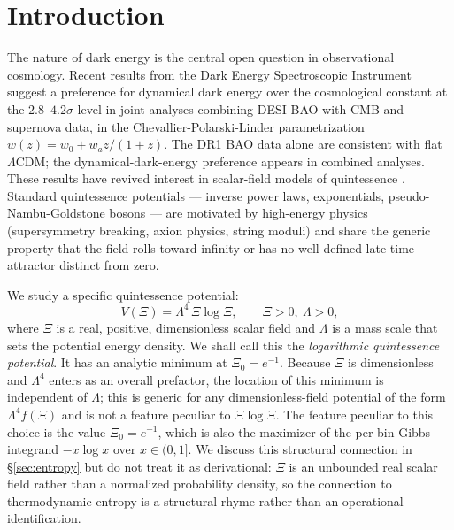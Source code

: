 \documentclass[11pt,reqno]{amsart}
\theoremstyle{plain}
\theoremstyle{definition}
\theoremstyle{remark}
\begin{document}
\maketitle

\section{Introduction}

The nature of dark energy is the central open question in observational
cosmology. Recent results from the Dark Energy Spectroscopic Instrument
\cite{DESI2024BAO,DESI2024VI} suggest a preference for dynamical dark energy
over the cosmological constant at the $2.8$--$4.2\sigma$ level in joint
analyses combining DESI BAO with CMB and supernova data, in the
Chevallier-Polarski-Linder \cite{CPL2001} parametrization
$w(z) = w_0 + w_a z/(1+z)$. The DR1 BAO data alone are consistent with flat
$\Lambda$CDM; the dynamical-dark-energy preference appears in combined
analyses. These results have revived interest in scalar-field models of
quintessence \cite{RatraPeebles1988,Wetterich1988,Frieman1995}. Standard
quintessence potentials --- inverse power laws, exponentials,
pseudo-Nambu-Goldstone bosons --- are motivated by high-energy physics
(supersymmetry breaking, axion physics, string moduli) and share the
generic property that the field rolls toward infinity or has no
well-defined late-time attractor distinct from zero.

We study a specific quintessence potential:
\begin{equation}\label{eq:Vxi}
  V(\Xi) = \Lambda^{4}\,\Xi\log\Xi,
  \qquad \Xi > 0,\ \Lambda > 0,
\end{equation}
where $\Xi$ is a real, positive, dimensionless scalar field and $\Lambda$ is
a mass scale that sets the potential energy density. We shall call this the
\emph{logarithmic quintessence potential}. It has an analytic minimum at
$\Xi_0 = e^{-1}$. Because $\Xi$ is dimensionless and $\Lambda^{4}$ enters
as an overall prefactor, the location of this minimum is independent of
$\Lambda$; this is generic for any dimensionless-field potential of the
form $\Lambda^{4} f(\Xi)$ and is not a feature peculiar to $\Xi\log\Xi$.
The feature peculiar to this choice is the value $\Xi_0 = e^{-1}$, which
is also the maximizer of the per-bin Gibbs integrand $-x\log x$ over
$x \in (0,1]$. We discuss this structural connection in
\S\ref{sec:entropy} but do not treat it as derivational: $\Xi$ is an
unbounded real scalar field rather than a normalized probability density,
so the connection to thermodynamic entropy is a structural rhyme rather
than an operational identification.
\end{document}
